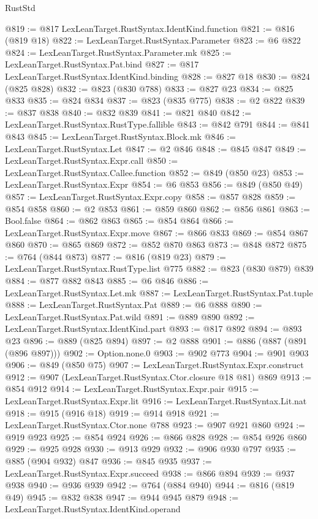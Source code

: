 \begin{lexlean}{RustStd}
\begin{coremodule}
@819 := @817 LexLeanTarget.RustSyntax.IdentKind.function
@821 := @816 (@819 @18)
@822 := LexLeanTarget.RustSyntax.Parameter
@823 := @6 @822
@824 := LexLeanTarget.RustSyntax.Parameter.mk
@825 := LexLeanTarget.RustSyntax.Pat.bind
@827 := @817 LexLeanTarget.RustSyntax.IdentKind.binding
@828 := @827 @18
@830 := @824 (@825 @828)
@832 := @823 (@830 @788)
@833 := @827 @23
@834 := @825 @833
@835 := @824 @834
@837 := @823 (@835 @775)
@838 := @2 @822
@839 := @837 @838
@840 := @832 @839
@841 := @821 @840
@842 := LexLeanTarget.RustSyntax.RustType.fallible
@843 := @842 @791
@844 := @841 @843
@845 := LexLeanTarget.RustSyntax.Block.mk
@846 := LexLeanTarget.RustSyntax.Let
@847 := @2 @846
@848 := @845 @847
@849 := LexLeanTarget.RustSyntax.Expr.call
@850 := LexLeanTarget.RustSyntax.Callee.function
@852 := @849 (@850 @23)
@853 := LexLeanTarget.RustSyntax.Expr
@854 := @6 @853
@856 := @849 (@850 @49)
@857 := LexLeanTarget.RustSyntax.Expr.copy
@858 := @857 @828
@859 := @854 @858
@860 := @2 @853
@861 := @859 @860
@862 := @856 @861
@863 := Bool.false
@864 := @862 @863
@865 := @854 @864
@866 := LexLeanTarget.RustSyntax.Expr.move
@867 := @866 @833
@869 := @854 @867 @860
@870 := @865 @869
@872 := @852 @870 @863
@873 := @848 @872
@875 := @764 (@844 @873)
@877 := @816 (@819 @23)
@879 := LexLeanTarget.RustSyntax.RustType.list @775
@882 := @823 (@830 @879) @839
@884 := @877 @882 @843
@885 := @6 @846
@886 := LexLeanTarget.RustSyntax.Let.mk
@887 := LexLeanTarget.RustSyntax.Pat.tuple
@888 := LexLeanTarget.RustSyntax.Pat
@889 := @6 @888
@890 := LexLeanTarget.RustSyntax.Pat.wild
@891 := @889 @890
@892 := LexLeanTarget.RustSyntax.IdentKind.part
@893 := @817 @892
@894 := @893 @23
@896 := @889 (@825 @894)
@897 := @2 @888
@901 := @886 (@887 (@891 (@896 @897)))
@902 := Option.none.{0}
@903 := @902 @773
@904 := @901 @903
@906 := @849 (@850 @75)
@907 := LexLeanTarget.RustSyntax.Expr.construct
@912 := @907 (LexLeanTarget.RustSyntax.Ctor.closure @18 @81) @869
@913 := @854 @912
@914 := LexLeanTarget.RustSyntax.Expr.pair
@915 := LexLeanTarget.RustSyntax.Expr.lit
@916 := LexLeanTarget.RustSyntax.Lit.nat
@918 := @915 (@916 @18)
@919 := @914 @918
@921 := LexLeanTarget.RustSyntax.Ctor.none @788
@923 := @907 @921 @860
@924 := @919 @923
@925 := @854 @924
@926 := @866 @828
@928 := @854 @926 @860
@929 := @925 @928
@930 := @913 @929
@932 := @906 @930 @797
@935 := @885 (@904 @932) @847
@936 := @845 @935
@937 := LexLeanTarget.RustSyntax.Expr.succeed
@938 := @866 @894
@939 := @937 @938
@940 := @936 @939
@942 := @764 (@884 @940)
@944 := @816 (@819 @49)
@945 := @832 @838
@947 := @944 @945 @879
@948 := LexLeanTarget.RustSyntax.IdentKind.operand

\end{coremodule}
\end{lexlean}
